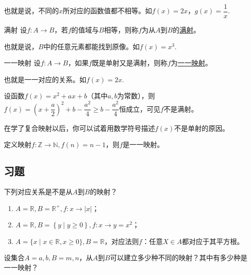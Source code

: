 \documentclass[lang=cn,math=cm,chinesefont=nofont,11pt,scheme=chinese,onecol]{elegantbook}
\begin{document}
也就是说，不同的$x$所对应的函数值都不相等。如$f(x)=2x$，$g(x)=\dfrac{1}{x}$.

\begin{definition}{满射}
  设$f:A\rightarrow B$，若$f$的值域与$B$相等，则称$f$为从$A$到$B$的\underline{满射}。
\end{definition}

也就是说，$B$中的任意元素都能找到原像。如$f(x)=x^3$.

\begin{definition}{一一映射}
  设$f:A\rightarrow B$，如果$f$既是单射又是满射，则称$f$为\underline{一一映射}。
\end{definition}

也就是一一对应的关系。如$f(x)=2x$.

\begin{example}
  设函数$f(x)=x^2+ax+b$（其中$a,b$为常数），则$f(x)=(x+\dfrac{a}{2})^2+b-\dfrac{a^2}{4}\geqslant b-\dfrac{a^2}{4}$恒成立，可见$f$不是满射。

  在学了复合映射以后，你可以试着用数学符号描述$f(x)$不是单射的原因。
\end{example}

\begin{example}
  定义映射$f:\mathbb{Z}\rightarrow\mathbb{N},f(n)=n-1$，则$f$是一一映射。
\end{example}

\subsection{习题}

\begin{exercise}\label{HS2FZ_lkb1_P34_exp.4,BJSZ_Algebra1_P40}
  下列对应关系是不是从$A$到$B$的映射？
\end{exercise}

\begin{enumerate}
  \item $A=\mathbb{R},B=\mathbb{R}^{+},f:x\rightarrow\left|x\right|$；
  \item $A=\mathbb{R},B=\left\{y\mid y\geqslant 0\right\},f:x\rightarrow y=x^2$；
  \item $A=\{x\mid x\in\mathbb{R},x\geqslant0\},B=\mathbb{R}$，对应法则$f$：任意$X\in A$都对应于其平方根。
\end{enumerate}

\begin{exercise}
  设集合$A={a,b},B={m,n}$，从$A$到$B$可以建立多少种不同的映射？其中有多少种是一一映射？
\end{exercise}
\end{document}
